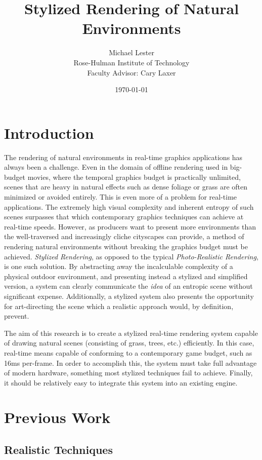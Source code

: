 \documentclass[notitlepage]{report}
\title{Stylized Rendering of Natural Environments}
\author{Michael Lester\\
        Rose-Hulman Institute of Technology\\
        Faculty Advisor: Cary Laxer}
\date{\today}
\begin{document}
\maketitle{}
\tableofcontents

\chapter{Introduction}
    The rendering of natural environments in real-time graphics applications has always been a challenge. Even in the domain of offline rendering used in big-budget movies, where the temporal graphics budget is practically unlimited, scenes that are heavy in natural effects such as dense foliage or grass are often minimized or avoided entirely. This is even more of a problem for real-time applications. The extremely high visual complexity and inherent entropy of such scenes surpasses that which contemporary graphics techniques can achieve at real-time speeds. However, as producers want to present more environments than the well-traversed and increasingly cliche cityscapes can provide, a method of rendering natural environments without breaking the graphics budget must be achieved. \emph{Stylized Rendering}, as opposed to the typical \emph{ Photo-Realistic Rendering}, is one such solution. By abstracting away the incalculable complexity of a physical outdoor environment, and presenting instead a stylized and simplified version, a system can clearly communicate the \emph{idea} of an entropic scene without significant expense. Additionally, a stylized system also presents the opportunity for art-directing the scene which a realistic approach would, by definition, prevent.
    
    The aim of this research is to create a stylized real-time rendering system capable of drawing natural scenes (consisting of grass, trees, etc.) efficiently. In this case, real-time means capable of conforming to a contemporary game budget, such as 16ms per-frame. In order to accomplish this, the system must take full advantage of modern hardware, something most stylized techniques fail to achieve. Finally, it should be relatively easy to integrate this system into an existing engine. 

\chapter{Previous Work}
\section{Realistic Techniques}
    
\end{document}
